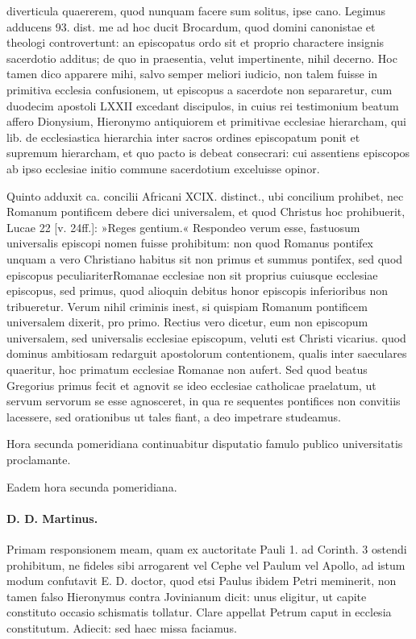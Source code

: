 diverticula quaererem, quod nunquam facere sum solitus, ipse cano. Legimus adducens 93. dist. me ad hoc ducit Brocardum, quod domini canonistae et theologi controvertunt: an episcopatus ordo sit et proprio charactere insignis sacerdotio additus; de quo in praesentia, velut impertinente, nihil decerno. Hoc tamen dico apparere mihi, salvo semper meliori iudicio, non talem fuisse in primitiva ecclesia confusionem, ut episcopus a sacerdote non separaretur, cum duodecim apostoli LXXII excedant discipulos, in cuius rei testimonium beatum affero Dionysium, Hieronymo antiquiorem et primitivae ecclesiae hierarcham, qui lib. de ecclesiastica hierarchia inter sacros ordines episcopatum ponit et supremum hierarcham, et quo pacto is debeat consecrari: cui assentiens episcopos ab ipso ecclesiae initio commune sacerdotium exceluisse opinor.

\marginpar{\small[263]} Quinto adduxit ca. concilii Africani XCIX. distinct., ubi concilium prohibet, nec Romanum pontificem debere dici universalem, et quod Christus hoc prohibuerit, Lucae 22 [v. 24ff.]: »Reges gentium.« Respondeo verum esse, fastuosum universalis episcopi nomen fuisse prohibitum: non quod Romanus pontifex unquam a vero Christiano habitus sit non primus et summus pontifex, sed quod episcopus peculiariterRomanae ecclesiae non sit proprius cuiusque ecclesiae episcopus, sed primus, quod alioquin debitus honor episcopis inferioribus non tribueretur. Verum nihil criminis inest, si quispiam Romanum pontificem universalem dixerit, pro primo. Rectius vero dicetur, eum non episcopum universalem, sed universalis ecclesiae episcopum, veluti est Christi vicarius. quod dominus ambitiosam redarguit apostolorum contentionem, qualis inter saeculares quaeritur, hoc primatum ecclesiae Romanae non aufert. Sed quod beatus Gregorius primus fecit et agnovit se ideo ecclesiae catholicae praelatum, ut servum servorum se esse agnosceret, in qua re sequentes pontifices non convitiis lacessere, sed orationibus ut tales fiant, a deo impetrare studeamus.

Hora secunda pomeridiana continuabitur disputatio famulo publico universitatis proclamante.

Eadem hora secunda pomeridiana.

\paragraph*{D. D. Martinus.}

Primam responsionem meam, quam ex auctoritate Pauli 1. ad Corinth. 3 ostendi prohibitum, ne fideles sibi arrogarent vel Cephe vel Paulum vel Apollo, ad istum modum confutavit E. D. doctor, quod etsi Paulus ibidem Petri meminerit, non tamen falso Hieronymus contra Jovinianum dicit: unus eligitur, ut capite constituto occasio schismatis tollatur. Clare appellat Petrum caput in ecclesia constitutum. Adiecit: sed haec missa faciamus.

